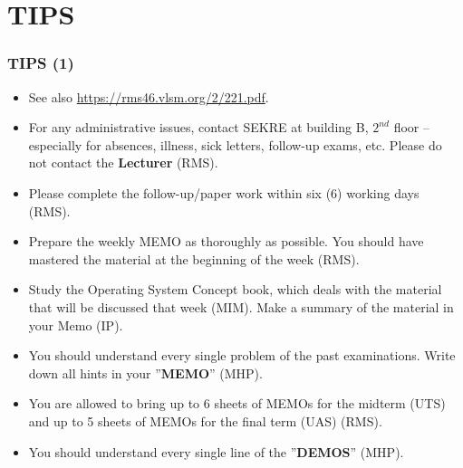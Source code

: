 
\section{TIPS}

\begin{frame}[fragile]
\frametitle{TIPS (1)}

\begin{itemize}

\item See also \url{https://rms46.vlsm.org/2/221.pdf}.

\item For any administrative issues, contact SEKRE at building B, $2^{nd}$ floor --
      especially for absences, illness, sick letters, follow-up exams, etc.
      Please do not contact the \textbf{Lecturer} (RMS).

\item Please complete the follow-up/paper work within six (6) working days (RMS).

\item Prepare the weekly MEMO as thoroughly as possible. 
      You should have mastered the material at the beginning of the week (RMS).

\item Study the Operating System Concept book, which deals with the material that
      will be discussed that week (MIM). Make a summary of the material in your Memo (IP).

\item You should understand every single problem of the past examinations.
      Write down all hints in your ''\textbf{MEMO}'' (MHP).

\item You are allowed to bring up to 6 sheets of MEMOs for the midterm (UTS) and
      up to 5 sheets of MEMOs for the final term (UAS) (RMS).

\item You should understand every single line of the ''\textbf{DEMOS}'' (MHP).

\end{itemize}

\end{frame}

